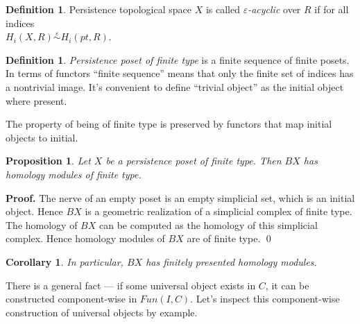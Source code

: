 \documentclass[a4paper, 12pt]{article}
\newcounter{stmcounter}[section]
\numberwithin{equation}{section}
\newtheorem{proposition}[stmcounter]{Proposition}
\newtheorem{corollary}[stmcounter]{Corollary}
\theoremstyle{definition}
\newtheorem{definition}[stmcounter]{Definition}
\theoremstyle{remark}
\newenvironment{pf}{\noindent\textbf{Proof.}}{\qed}
\newcommand{\define}[1]{{\textit{#1}}}
\begin{document}
\begin{definition}
  Persistence topological space $X$ is called \define{$\varepsilon$-acyclic} over $R$ if for all indices\\ $H_i(X,R) \stackrel{\varepsilon}{\sim} H_i(pt,R)$.
\end{definition}

\begin{definition}
  \define{Persistence poset of finite type} is a finite sequence of finite posets.\\

  In terms of functors ``finite sequence'' means that only the finite set of indices has a nontrivial image. It's convenient to define ``trivial object'' as the initial object where present.
\end{definition}

The property of being of finite type is preserved by functors that map initial objects to initial.\\

\begin{proposition}
  Let $X$ be a persistence poset of finite type. Then $BX$ has homology modules of finite type.
\end{proposition}

\begin{pf}
  The nerve of an empty poset is an empty simplicial set, which is an initial object. Hence $BX$ is a geometric realization of a simplicial complex of finite type. The homology of $BX$ can be computed as the homology of this simplicial complex. Hence homology modules of $BX$ are of finite type.
\end{pf}\\

\begin{corollary}
  In particular, $BX$ has finitely presented homology modules.
\end{corollary}

There is a general fact --- if some universal object exists in $C$, it can be constructed component-wise in $Fun(I,C)$. Let's inspect this component-wise construction of universal objects by example.\\
\end{document}
